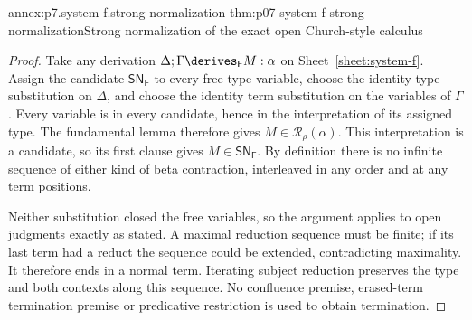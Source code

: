 \begin{annexitem}{annex:p7.system-f.strong-normalization}
 {thm:p07-system-f-strong-normalization}{Strong normalization of the exact open Church-style calculus}
\begin{proof}
Take any derivation \(\Delta;\Gamma\derives_{\mathsf F}M:\alpha\)
on Sheet~\ref{sheet:system-f}. Assign the candidate
\(\mathsf{SN}_{\mathsf F}\) to every free type variable, choose the
identity type substitution on \(\Delta\), and choose the identity
term substitution on the variables of \(\Gamma\). Every variable is
in every candidate, hence in the interpretation of its assigned type.
The fundamental lemma therefore gives
\(M\in\mathcal R_\rho(\alpha)\). This interpretation is a candidate,
so its first clause gives \(M\in\mathsf{SN}_{\mathsf F}\).
By definition there is no infinite sequence of either kind of beta
contraction, interleaved in any order and at any term positions.

Neither substitution closed the free variables, so the argument applies
to open judgments exactly as stated. A maximal reduction sequence must
be finite; if its last term had a reduct the sequence could be extended,
contradicting maximality. It therefore ends in a normal term. Iterating
subject reduction preserves the type and both contexts along this sequence.
No confluence premise, erased-term termination premise or predicative
restriction is used to obtain termination.
\end{proof}
\end{annexitem}
